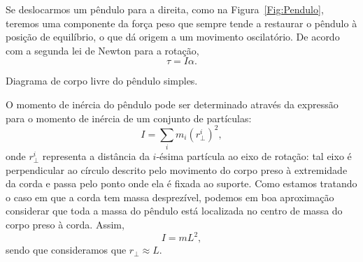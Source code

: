 Se deslocarmos um pêndulo para a direita, como na Figura~\ref{Fig:Pendulo}, teremos uma componente da força peso que sempre tende a restaurar o pêndulo à posição de equilíbrio, o que dá origem a um movimento oscilatório. De acordo com a segunda lei de Newton para a rotação,
\begin{equation}
    \tau = I\alpha.
\end{equation}

\begin{marginfigure}
\centering
{}
\caption{Diagrama de corpo livre do pêndulo simples.}
\label{Fig:Pendulo}
\end{marginfigure}

O momento de inércia do pêndulo pode ser determinado através da expressão para o momento de inércia de um conjunto de partículas:
\begin{equation}
    I = \sum_i m_i (r_\perp^i)^2,
\end{equation}
%
onde $r_\perp^i$ representa a distância da $i$-ésima partícula ao eixo de rotação: tal eixo é perpendicular ao círculo descrito pelo movimento do corpo preso à extremidade da corda e passa pelo ponto onde ela é fixada ao suporte. Como estamos tratando o caso em que a corda tem massa desprezível, podemos em boa aproximação considerar que toda a massa do pêndulo está localizada no centro de massa do corpo preso à corda. Assim,
\begin{equation}
    I = m L^2,
\end{equation}
%
sendo que consideramos que $r_\perp \approx L$.


